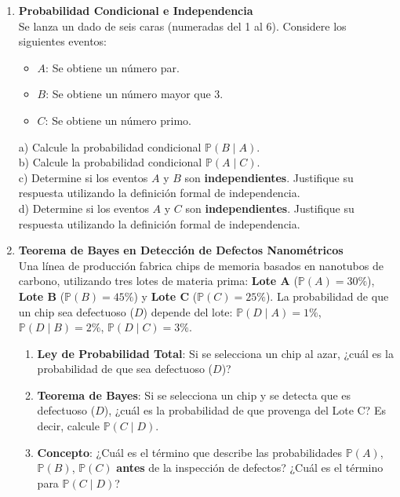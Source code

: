 \documentclass[12pt, a4paper]{article}
\begin{document}
\begin{enumerate}
    \vspace{0.8cm}

    \item[\textbf{3.}] \textbf{Probabilidad Condicional e Independencia}
    \\
    Se lanza un dado de seis caras (numeradas del 1 al 6). Considere los siguientes eventos:
    \begin{itemize}
        \item $A$: Se obtiene un número par.
        \item $B$: Se obtiene un número mayor que 3.
        \item $C$: Se obtiene un número primo.
    \end{itemize}
    a) Calcule la probabilidad condicional $\mathbb{P}(B \mid A)$.
    \\
    b) Calcule la probabilidad condicional $\mathbb{P}(A \mid C)$.
    \\
    c) Determine si los eventos $A$ y $B$ son \textbf{independientes}. Justifique su respuesta utilizando la definición formal de independencia.
    \\
    d) Determine si los eventos $A$ y $C$ son \textbf{independientes}. Justifique su respuesta utilizando la definición formal de independencia.

    \vspace{0.8cm}

    \item[\textbf{4.}] \textbf{Teorema de Bayes en Detección de Defectos Nanométricos}
    \\
    Una línea de producción fabrica chips de memoria basados en nanotubos de carbono, utilizando tres lotes de materia prima: \textbf{Lote A} ($\mathbb{P}(A)=30\%$), \textbf{Lote B} ($\mathbb{P}(B)=45\%$) y \textbf{Lote C} ($\mathbb{P}(C)=25\%$). La probabilidad de que un chip sea defectuoso ($D$) depende del lote: $\mathbb{P}(D \mid A) = 1\%$, $\mathbb{P}(D \mid B) = 2\%$, $\mathbb{P}(D \mid C) = 3\%$.
    \\
    \begin{enumerate}
        \item[\textbf{a)}] \textbf{Ley de Probabilidad Total}: Si se selecciona un chip al azar, ¿cuál es la probabilidad de que sea defectuoso ($D$)?
        \item[\textbf{b)}] \textbf{Teorema de Bayes}: Si se selecciona un chip y se detecta que es defectuoso ($D$), ¿cuál es la probabilidad de que provenga del Lote C? Es decir, calcule $\mathbb{P}(C \mid D)$.
        \item[\textbf{c)}] \textbf{Concepto}: ¿Cuál es el término que describe las probabilidades $\mathbb{P}(A)$, $\mathbb{P}(B)$, $\mathbb{P}(C)$ \textbf{antes} de la inspección de defectos? ¿Cuál es el término para $\mathbb{P}(C \mid D)$?
    \end{enumerate}

\end{enumerate}
\end{document}
